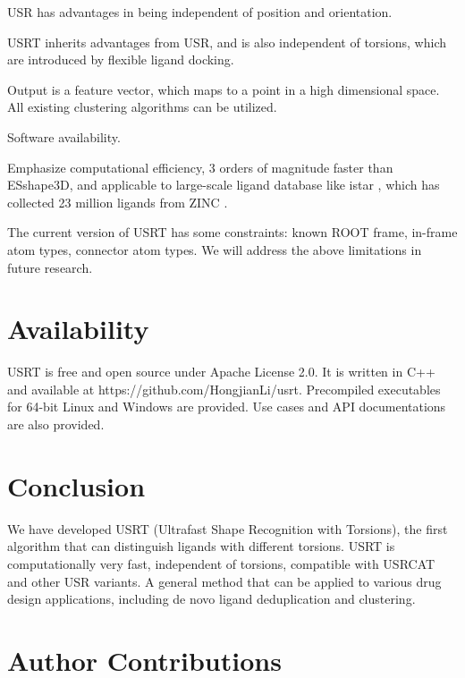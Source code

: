 \documentclass[twocolumn]{svjour3}          %
\begin{document}

USR has advantages in being independent of position and orientation.

USRT inherits advantages from USR, and is also independent of torsions, which are introduced by flexible ligand docking.

Output is a feature vector, which maps to a point in a high dimensional space. All existing clustering algorithms can be utilized.

Software availability.

Emphasize computational efficiency, 3 orders of magnitude faster than ESshape3D, and applicable to large-scale ligand database like istar \cite{1362}, which has collected 23 million ligands from ZINC \cite{532,1178}.

The current version of USRT has some constraints: known ROOT frame, in-frame atom types, connector atom types. We will address the above limitations in future research.

\section{Availability}

USRT is free and open source under Apache License 2.0. It is written in C++ and available at https://github.com/HongjianLi/usrt. Precompiled executables for 64-bit Linux and Windows are provided. Use cases and API documentations are also provided.

\section{Conclusion}

We have developed USRT (Ultrafast Shape Recognition with Torsions), the first algorithm that can distinguish ligands with different torsions. USRT is computationally very fast, independent of torsions, compatible with USRCAT and other USR variants.
A general method that can be applied to various drug design applications, including de novo ligand deduplication and clustering.

\section{Author Contributions}
\end{document}
